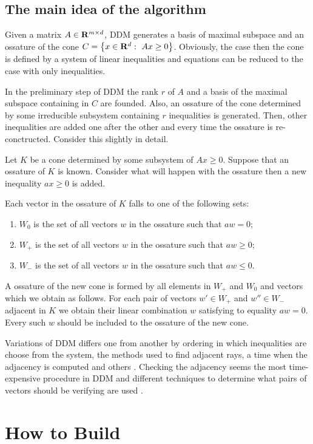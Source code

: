 \documentclass{article}
\newcommand{\RR}{{\rm\bf R}}
\newcommand{\set}[1]{\left\{ #1\right\}}
\begin{document}
\subsection{The main idea of the algorithm}

Given a matrix $A\in\RR^{m\times d}$, DDM generates
a basis of maximal subspace and an ossature of the cone $C=\set{x\in\RR^d:~Ax\ge 0}$.
Obviously, the case then the cone is defined by a system of linear
inequalities and equations can be reduced to the case with only inequalities.

In the preliminary step of DDM the rank $r$ of $A$ and a basis of the
maximal subspace containing in $C$ are founded. Also, an ossature of the
cone determined by some irreducible subsystem containing $r$ inequalities
is generated. Then, other inequalities are added one after the other and
every time the ossature is re-conctructed. Consider this slightly in
detail.

Let $K$ be a cone determined by some subsystem of $Ax\ge 0$.
Suppose that an ossature of $K$  is known.
Consider what will happen with the ossature then a new inequality $ax \ge 0$ 
is added. 

Each vector in the ossature of $K$
falls to one of the following sets: 
\begin{enumerate}
  \item $W_0$ is the set of all vectors $w$ in the ossature such that $aw = 0$;
  \item $W_+$ is the set of all vectors $w$ in the ossature such that $aw \ge 0$;
  \item $W_-$ is the set of all vectors $w$ in the ossature such that $aw \le 0$.
\end{enumerate}
A ossature of the new cone is formed by all elements in $W_+$ and $W_0$
and vectors which we obtain as follows. For each pair of vectors
$w'\in W_+$ and $w''\in W_-$ adjacent in $K$ we obtain their linear combination $w$
satisfying to equality $aw=0$. Every such $w$ should be included to the ossature
of the new cone.
        
Variations of DDM differs one from another by 
ordering in which inequalities are choose from the system,
the methods used to find adjacent rays,
a time when the adjacency is computed and others \cite{VPSh84,FP96,ShCh97}.
Checking the adjacency seems the most time-expensive procedure in DDM
and different techniques to determine what pairs of vectors should be 
verifying are used \cite{FP96}.

\section{How to Build}
\end{document}
